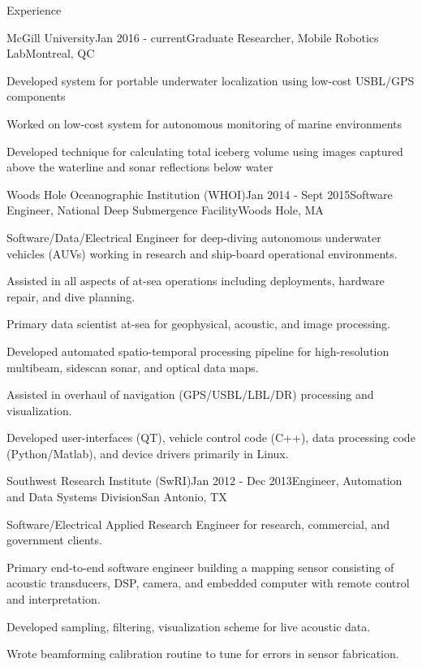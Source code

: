 \documentclass{resume} %
\begin{document}

\begin{rSection}{Experience}

\begin{rSubsection}{McGill University}{Jan 2016 - current}{Graduate Researcher, Mobile Robotics Lab}{Montreal, QC}
\item{Developed system for portable underwater localization using low-cost USBL/GPS components} 
\item{Worked on low-cost system for autonomous monitoring of marine environments}
\item{Developed technique for calculating total iceberg volume using images captured above the  waterline and sonar reflections below water}
\end{rSubsection}

\begin{rSubsection}{Woods Hole Oceanographic Institution (WHOI)}{Jan 2014 - Sept 2015}{Software Engineer, National Deep Submergence Facility}{Woods Hole, MA}
\item{Software/Data/Electrical Engineer for deep-diving autonomous underwater vehicles (AUVs) working in research and ship-board operational environments.}
\item{Assisted in all aspects of at-sea operations including deployments, hardware repair, and dive planning.}
\item{Primary data scientist at-sea for geophysical, acoustic, and image processing.}
\item{Developed automated spatio-temporal processing pipeline for high-resolution multibeam, sidescan sonar, and optical data maps.}
\item{Assisted in overhaul of navigation (GPS/USBL/LBL/DR) processing and visualization.}
\item{Developed user-interfaces (QT), vehicle control code (C++), data processing code (Python/Matlab), and device drivers primarily in Linux.}
\end{rSubsection}
%
\begin{rSubsection}{Southwest Research Institute (SwRI)}{Jan 2012 - Dec 2013}{Engineer, Automation and Data Systems Division}{San Antonio, TX}{}
\item{Software/Electrical Applied Research Engineer for research, commercial, and government clients.}
\item{Primary end-to-end software engineer building a mapping sensor consisting of acoustic transducers, DSP, camera, and embedded computer with remote control and interpretation.}
\item{Developed sampling, filtering, visualization scheme for live acoustic data.}
\item{Wrote beamforming calibration routine to tune for errors in sensor fabrication.}
\end{rSubsection}


\end{rSection}
\end{document}
